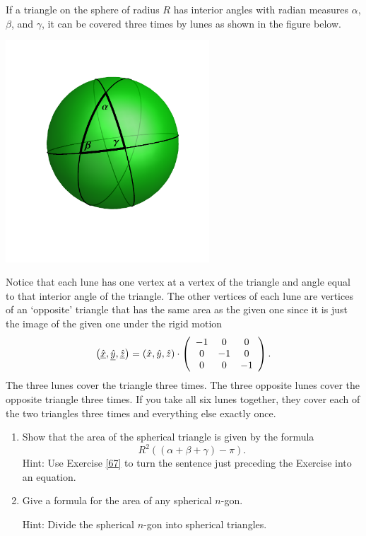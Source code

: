 \documentclass{ximera}
\begin{document}
If a triangle on the sphere of radius $R$ has interior angles with radian
measures $\alpha$, $\beta$, and $\gamma$, it can be covered three times by
lunes as shown in the figure below.%
\begin{image}
\includegraphics[width=3in]{W13_4.png}%
\end{image}
Notice that each lune has one vertex at a vertex of the triangle and angle
equal to that interior angle of the triangle. The other vertices of each lune
are vertices of an `opposite' triangle that has the same area as the given one
since it is just the image of the given one under the rigid motion%
\[
\left(  \underline{\hat{x}},\underline{\hat{y}},\underline{\hat{z}}\right)
=\left(  \hat{x},\hat{y},\hat{z}\right)  \cdot\left(
\begin{array}
[c]{ccc}%
-1 & 0 & 0\\
0 & -1 & 0\\
0 & 0 & -1
\end{array}
\right)  .
\]
The three lunes cover the triangle three times. The three opposite
lunes cover the opposite triangle three times. If you take all six
lunes together, they cover each of the two triangles three times and
everything else exactly once.

\begin{exercise}\hfil
\begin{enumerate}
\item Show that the area of the spherical triangle is given by the
formula%
\[
R^{2}\left(  \left(  \alpha+\beta+\gamma\right)  -\pi\right).
\]
Hint: Use Exercise \ref{67} to turn the sentence just preceding the Exercise
into an equation.

\item Give a formula for the area of any spherical $n$-gon.

Hint: Divide the spherical $n$-gon into spherical triangles.
\end{enumerate}
\end{exercise}
\end{document}
